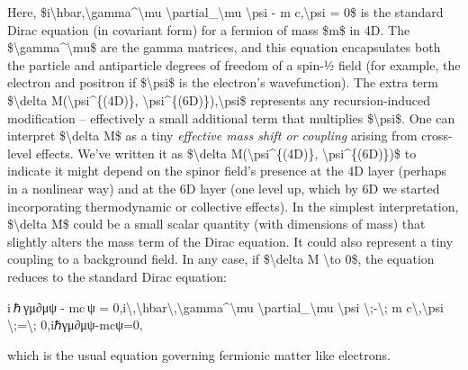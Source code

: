 \documentclass[
]{article}
\begin{document}
Here, \$i\textbackslash hbar,\textbackslash gamma\^{}\textbackslash mu
\textbackslash partial\_\textbackslash mu \textbackslash psi - m
c,\textbackslash psi = 0\$ is the standard Dirac equation (in covariant
form) for a fermion of mass \$m\$ in 4D. The
\$\textbackslash gamma\^{}\textbackslash mu\$ are the gamma matrices,
and this equation encapsulates both the particle and antiparticle
degrees of freedom of a spin-½ field (for example, the electron and
positron if \$\textbackslash psi\$ is the electron's wavefunction). The
extra term \$\textbackslash delta M(\textbackslash psi\^{}\{(4D)\},
\textbackslash psi\^{}\{(6D)\}),\textbackslash psi\$ represents any
recursion-induced modification -- effectively a small additional term
that multiplies \$\textbackslash psi\$. One can interpret
\$\textbackslash delta M\$ as a tiny \emph{effective mass shift or
coupling} arising from cross-level effects. We've written it as
\$\textbackslash delta M(\textbackslash psi\^{}\{(4D)\},
\textbackslash psi\^{}\{(6D)\})\$ to indicate it might depend on the
spinor field's presence at the 4D layer (perhaps in a nonlinear way) and
at the 6D layer (one level up, which by 6D we started incorporating
thermodynamic or collective effects). In the simplest interpretation,
\$\textbackslash delta M\$ could be a small scalar quantity (with
dimensions of mass) that slightly alters the mass term of the Dirac
equation. It could also represent a tiny coupling to a background field.
In any case, if \$\textbackslash delta M \textbackslash to 0\$, the
equation reduces to the standard Dirac equation:

i ℏ γμ∂μψ  -  mc ψ  =  0,i\textbackslash,\textbackslash hbar\textbackslash,\textbackslash gamma\^{}\textbackslash mu
\textbackslash partial\_\textbackslash mu \textbackslash psi
\textbackslash;-\textbackslash; m c\textbackslash,\textbackslash psi
\textbackslash;=\textbackslash; 0,iℏγμ∂μ\hspace{0pt}ψ-mcψ=0,

which is the usual equation governing fermionic matter like electrons.
\end{document}
